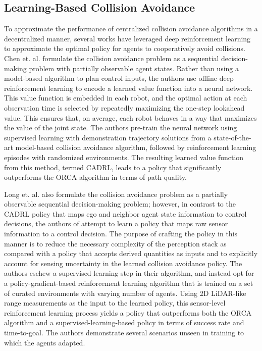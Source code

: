 \documentclass[conference]{IEEEtran}
\begin{document}
\subsection{Learning-Based Collision Avoidance}
To approximate the performance of centralized collision avoidance algorithms in a decentralized manner, several works have leveraged deep reinforcement learning to approximate the optimal policy for agents to cooperatively avoid collisions. Chen et. al. \cite{chen2017cadrl} formulate the collision avoidance problem as a sequential decision-making problem with partially observable agent states. Rather than using a model-based algorithm to plan control inputs, the authors use offline deep reinforcement learning to encode a learned value function into a neural network. This value function is embedded in each robot, and the optimal action at each observation time is selected by repeatedly maximizing the one-step lookahead value. This ensures that, on average, each robot behaves in a way that maximizes the value of the joint state. The authors pre-train the neural network using supervised learning with demonstration trajectory solutions from a state-of-the-art model-based collision avoidance algorithm, followed by reinforcement learning episodes with randomized environments. The resulting learned value function from this method, termed CADRL, leads to a policy that significantly outperforms the ORCA algorithm in terms of path quality.

Long et. al. \cite{long2018} also formulate the collision avoidance problem as a partially observable sequential decision-making problem; however, in contrast to the CADRL policy that maps ego and neighbor agent state information to control decisions, the authors of \cite{long2018} attempt to learn a policy that maps raw sensor information to a control decision. The purpose of crafting the policy in this manner is to reduce the necessary complexity of the perception stack as compared with a policy that accepts derived quantities as inputs and to explicitly account for sensing uncertainty in the learned collision avoidance policy. The authors eschew a supervised learning step in their algorithm, and instead opt for a policy-gradient-based reinforcement learning algorithm that is trained on a set of curated environments with varying number of agents. Using 2D LiDAR-like range measurements as the input to the learned policy, this sensor-level reinforcement learning process yields a policy that outperforms both the ORCA algorithm and a supervised-learning-based policy in terms of success rate and time-to-goal. The authors demonstrate several scenarios unseen in training to which the agents adapted.
\end{document}
